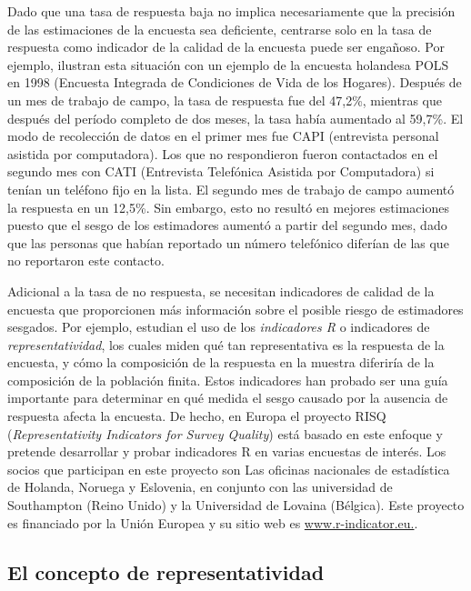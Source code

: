 \documentclass[
  10pt,
  spanish,
]{book}
\begin{document}
Dado que una tasa de respuesta baja no implica necesariamente que la precisión de las estimaciones de la encuesta sea deficiente, centrarse solo en la tasa de respuesta como indicador de la calidad de la encuesta puede ser engañoso. Por ejemplo, \citet{Bethlehem_Cobben_Schouten_2009} ilustran esta situación con un ejemplo de la encuesta holandesa POLS en 1998 (Encuesta Integrada de Condiciones de Vida de los Hogares). Después de un mes de trabajo de campo, la tasa de respuesta fue del 47,2\%, mientras que después del período completo de dos meses, la tasa había aumentado al 59,7\%. El modo de recolección de datos en el primer mes fue CAPI (entrevista
personal asistida por computadora). Los que no respondieron fueron
contactados en el segundo mes con CATI (Entrevista Telefónica Asistida
por Computadora) si tenían un teléfono fijo en la lista. El segundo mes de trabajo de campo aumentó la respuesta en un 12,5\%. Sin embargo, esto no resultó en mejores estimaciones puesto que el sesgo de los estimadores aumentó a partir del segundo mes, dado que las personas que habían reportado un número telefónico diferían de las que no reportaron este contacto.

Adicional a la tasa de no respuesta, se necesitan indicadores
de calidad de la encuesta que proporcionen más información sobre el
posible riesgo de estimadores sesgados. Por ejemplo, \citet{Shlomo_Skinner_Schouten_2012} estudian el uso de los \emph{indicadores R} o indicadores de \emph{representatividad}, los cuales miden qué tan representativa es la respuesta de la encuesta, y cómo la composición
de la respuesta en la muestra diferiría de la composición de la población finita. Estos indicadores han probado ser una guía importante para determinar en qué medida el sesgo causado por la ausencia de respuesta afecta la encuesta. De hecho, en Europa el proyecto RISQ (\emph{Representativity Indicators for Survey Quality}) está basado en este enfoque y pretende desarrollar y probar indicadores R en varias encuestas de interés. Los socios que participan en este proyecto son Las oficinas nacionales de estadística de Holanda, Noruega y Eslovenia, en conjunto con las universidad de Southampton (Reino Unido) y la Universidad de Lovaina (Bélgica). Este proyecto es financiado por la Unión Europea y su sitio web es \url{www.r-indicator.eu.}.

\hypertarget{el-concepto-de-representatividad}{%
\subsection{El concepto de representatividad}\label{el-concepto-de-representatividad}}
\end{document}
